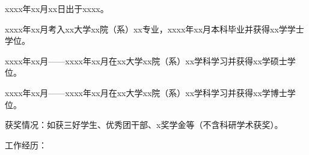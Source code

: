 
xxxx年xx月xx日出于xxxx。

xxxx年xx月考入xx大学xx院（系）xx专业，xxxx年xx月本科毕业并获得xx学学士学位。

xxxx年xx月——xxxx年xx月在xx大学xx院（系）xx学科学习并获得xx学硕士学位。

xxxx年xx月——xxxx年xx月在xx大学xx院（系）xx学科学习并获得xx学博士学位。

获奖情况：如获三好学生、优秀团干部、x奖学金等（不含科研学术获奖）。

工作经历：